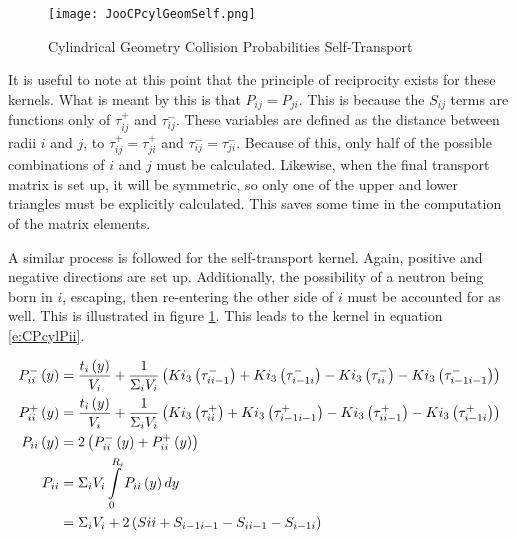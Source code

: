 \begin{figure}
  \centering
  \texttt{[image: JooCPcylGeomSelf.png]}
  \caption{Cylindrical Geometry Collision Probabilities Self-Transport}\label{f:CPcylGeomSelf}
\end{figure}

It is useful to note at this point that the principle of reciprocity exists for these kernels.  What is meant by this is that $P_{ij} = P_{ji}$.  This is because the $S_{ij}$ terms are functions only of $\tau_{ij}^+$ and $\tau_{ij}^-$.  These variables are defined as the distance between radii $i$ and $j$, to $\tau_{ij}^+ = \tau_{ji}^+$ and $\tau_{ij}^- = \tau_{ji}^-$.  Because of this, only half of the possible combinations of $i$ and $j$ must be calculated.  Likewise, when the final transport matrix is set up, it will be symmetric, so only one of the upper and lower triangles must be explicitly calculated.  This saves some time in the computation of the matrix elements.

A similar process is followed for the self-transport kernel.  Again, positive and negative directions are set up.  Additionally, the possibility of a neutron being born in $i$, escaping, then re-entering the other side of $i$ must be accounted for as well.  This is illustrated in figure \ref{f:CPcylGeomSelf}.  This leads to the kernel in equation \ref{e:CPcylPii}.

\begin{subequations}\label{e:CPcylPii}
  \begin{align}
  P_{ii}^-\left(y\right) &= \frac{t_i\left(y\right)}{V_i} + \frac{1}{\Sigma_i V_i}\left(Ki_3\left(\tau_{ii-1}^-\right) + Ki_3\left(\tau_{i-1i}^-\right) - Ki_3\left(\tau_{ii}^-\right) - Ki_3\left(\tau_{i-1i-1}^-\right)\right) \\
  P_{ii}^+\left(y\right) &= \frac{t_i\left(y\right)}{V_i} + \frac{1}{\Sigma_i V_i}\left(Ki_3\left(\tau_{ii}^+\right) + Ki_3\left(\tau_{i-1i-1}^+\right) - Ki_3\left(\tau_{ii-1}^+\right) - Ki_3\left(\tau_{i-1i}^+\right)\right) \\
  P_{ii}\left(y\right) &= 2 \left(P_{ii}^-\left(y\right) + P_{ii}^+\left(y\right)\right) \\
  P_{ii} &= \Sigma_i V_i \intop_0^{R_i} P_{ii}\left(y\right) dy \nonumber \\
  &= \Sigma_i V_i  + 2\left(S{ii} + S_{i-1i-1} - S_{ii-1} - S_{i-1i}\right)
  \end{align}
\end{subequations}

